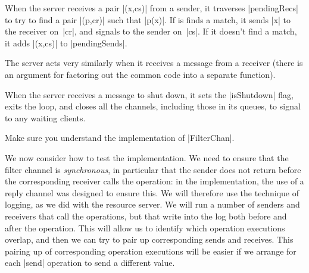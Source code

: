 When the server receives a pair |(x,cs)| from a sender, it traverses
|pendingRecs| to try to find a pair |(p,cr)| such that |p(x)|.  If is finds a
match, it sends |x| to the receiver on~|cr|, and signals to the sender
on~|cs|.  If it doesn't find a match, it adds |(x,cs)| to |pendingSends|.

The server acts very similarly when it receives a message from a receiver
(there is an argument for factoring out the common code into a separate
function).  

When the server receives a message to shut down, it sets the |isShutdown|
flag, exits the loop, and closes all the channels, including those in its
queues, to signal to any waiting clients.

\begin{instruction}
Make sure you understand the implementation of |FilterChan|.
\end{instruction}


We now consider how to test the implementation.  We need to
ensure that the filter channel is \emph{synchronous}, in particular that the
sender does not return before the corresponding receiver calls the operation:
in the implementation, the use of a reply channel was designed to ensure this.
We will therefore use the technique of logging, as we did with the resource
server.  We will run a number of senders and receivers that call the
operations, but that write into the log both before and after the operation.
This will allow us to identify which operation executions overlap, and then we
can try to pair up corresponding sends and receives.  
%
This pairing up of corresponding operation executions will be easier if we
arrange for each |send| operation to send a different value.  



